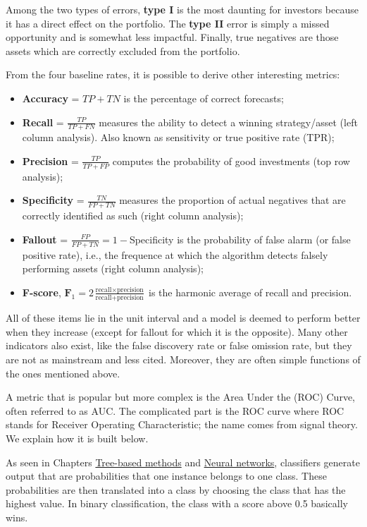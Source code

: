 Among the two types of errors, \textbf{type I} is the most daunting for investors because it has a direct effect on the portfolio. The \textbf{type II} error is simply a missed opportunity and is somewhat less impactful. Finally, true negatives are those assets which are correctly excluded from the portfolio.

From the four baseline rates, it is possible to derive other interesting metrics:

\begin{itemize}
\item \textbf{Accuracy} = $TP+TN$ is the percentage of correct forecasts;
\item \textbf{Recall} = $\frac{TP}{TP+FN}$ measures the ability to detect a winning strategy/asset (left column analysis). Also known as sensitivity or true positive rate (TPR);
\item \textbf{Precision} = $\frac{TP}{TP+FP}$ computes the probability of good investments (top row analysis);
\item \textbf{Specificity} = $\frac{TN}{FP+TN}$ measures the proportion of actual negatives that are correctly identified as such (right column analysis);
\item \textbf{Fallout} = $\frac{FP}{FP+TN}=1 -$Specificity is the probability of false alarm (or false positive rate), i.e., the frequence at which the algorithm detects falsely performing assets (right column analysis);
\item \textbf{F-score}, $\mathbf{F}_1=2\frac{\text{recall}\times \text{precision}}{\text{recall}+ \text{precision}}$ is the harmonic average of recall and precision.
\end{itemize}

All of these items lie in the unit interval and a model is deemed to perform better when they increase (except for fallout for which it is the opposite). Many other indicators also exist, like the false discovery rate or false omission rate, but they are not as mainstream and less cited. Moreover, they are often simple functions of the ones mentioned above.

A metric that is popular but more complex is the Area Under the (ROC) Curve, often referred to as AUC. The complicated part is the ROC curve where ROC stands for Receiver Operating Characteristic; the name comes from signal theory. We explain how it is built below.

As seen in Chapters \href{/chap-07-trees}{Tree-based methods} and \href{/chap-08-neural-networks}{Neural networks}, classifiers generate output that are probabilities that one instance belongs to one class. These probabilities are then translated into a class by choosing the class that has the highest value. In binary classification, the class with a score above 0.5 basically wins.

